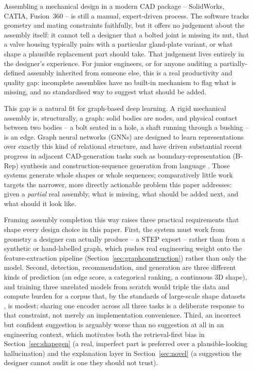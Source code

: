 \documentclass[sn-mathphys,Numbered]{sn-jnl}
\begin{document}
Assembling a mechanical design in a modern CAD package -- SolidWorks, CATIA, Fusion~360 -- is still a manual, expert-driven process. The software tracks geometry and mating constraints faithfully, but it offers no judgement about the assembly itself: it cannot tell a designer that a bolted joint is missing its nut, that a valve housing typically pairs with a particular gland-plate variant, or what shape a plausible replacement part should take. That judgement lives entirely in the designer's experience. For junior engineers, or for anyone auditing a partially-defined assembly inherited from someone else, this is a real productivity and quality gap: incomplete assemblies have no built-in mechanism to flag what is missing, and no standardised way to suggest what should be added.

This gap is a natural fit for graph-based deep learning. A rigid mechanical assembly is, structurally, a graph: solid bodies are nodes, and physical contact between two bodies -- a bolt seated in a hole, a shaft running through a bushing -- is an edge. Graph neural networks (GNNs) are designed to learn representations over exactly this kind of relational structure, and have driven substantial recent progress in adjacent CAD-generation tasks such as boundary-representation (B-Rep) synthesis \cite{brepgen2024,solidgen2024} and construction-sequence generation from language \cite{cadgpt2025}. Those systems generate whole shapes or whole sequences; comparatively little work targets the narrower, more directly actionable problem this paper addresses: given a \emph{partial} real assembly, what is missing, what should be added next, and what should it look like.

Framing assembly completion this way raises three practical requirements that shape every design choice in this paper. First, the system must work from geometry a designer can actually produce -- a STEP export -- rather than from a synthetic or hand-labelled graph, which pushes real engineering weight onto the feature-extraction pipeline (Section~\ref{sec:graphconstruction}) rather than only the model. Second, detection, recommendation, and generation are three different kinds of prediction (an edge score, a categorical ranking, a continuous 3D shape), and training three unrelated models from scratch would triple the data and compute burden for a corpus that, by the standards of large-scale shape datasets \cite{koch2019abc,mo2019partnet}, is modest; sharing one encoder across all three tasks is a deliberate response to that constraint, not merely an implementation convenience. Third, an incorrect but confident suggestion is arguably worse than no suggestion at all in an engineering context, which motivates both the retrieval-first bias in Section~\ref{sec:shapegen} (a real, imperfect part is preferred over a plausible-looking hallucination) and the explanation layer in Section~\ref{sec:novel} (a suggestion the designer cannot audit is one they should not trust).
\end{document}
